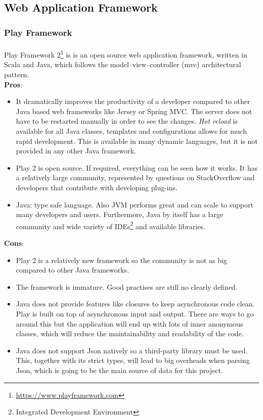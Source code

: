 \documentclass{l4proj}
\begin{document}
\subsection{Web Application Framework}

\subsubsection{Play Framework}
\paragraph{}
Play Framework 2\footnote{\url{https://www.playframework.com}} is is an open source web application framework, written in Scala and Java, which follows the model–view–controller (mvc) architectural pattern. 
\\ \textbf{Pros}:
\begin{itemize}

\item It dramatically improves the productivity of a developer compared to other Java based web frameworks like Jersey or Spring MVC. The server does not have to be restarted manually in order to see the changes. \textit{Hot reload} is available for all Java classes, templates and configurations allows for much rapid development. This is available in many dynamic languages, but it is not provided in any other Java framework.

\item Play 2 is open source. If required, everything can be seen how it works. It has a relatively large community, represented by questions on StackOverflow and developers that contribute with developing plug-ins.

\item Java: type safe language. Also JVM performs great and can scale to support many developers and users. Furthermore, Java by itself has a large community and 
wide variety of IDEs\footnote{Integrated Development Environment} and available libraries.
	
\end{itemize}
\textbf{Cons}:
\begin{itemize}
\item Play 2 is a relatively new framework so the community is not as big compared to other Java frameworks. 

\item The framework is immature. Good practises are still no clearly defined. 

\item Java does not provide features like closures to keep asynchronous code clean. Play is built on top of asynchronous input and output. There are ways to go around this but the application will end up with lots of inner anonymous classes, which will reduce the maintainability and readability of the code.

\item Java does not support Json natively so a third-party library must be used. This, together with its strict types, will lead to big overheads when parsing Json, which 
is going to be the main source of data for this project.  
\end{itemize}
\end{document}
